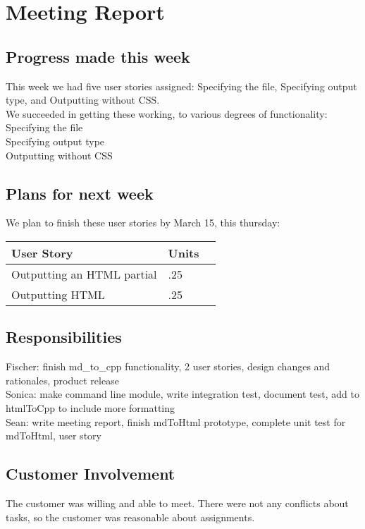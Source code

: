 \section{Meeting Report}

\subsection{Progress made this week}
This week we had five user stories assigned: Specifying the file, Specifying output type, and Outputting without CSS.\\
We succeeded in getting these working, to various degrees of functionality: \\
Specifying the file\\
Specifying output type\\
Outputting without CSS\\



\subsection{Plans for next week}
We plan to finish these user stories by March 15, this thursday:

 \begin{center}
    \begin{tabular}{ | l | l | p{5cm} |}
    \hline
    User Story & Units \\ \hline
    Outputting an HTML partial & .25 \\ \hline
    Outputting HTML & .25 \\ \hline
    \end{tabular}
\end{center}


\subsection{Responsibilities}
Fischer: finish md\_to\_cpp functionality, 2 user stories, design changes and rationales, product release  \\
Sonica: make command line module, write integration test, document test, add to htmlToCpp to include more formatting\\
Sean: write meeting report, finish mdToHtml prototype, complete unit test for mdToHtml, user story\\

\subsection{Customer Involvement}
The customer was willing and able to meet.
There were not any conflicts about tasks, so the customer was reasonable about assignments.

